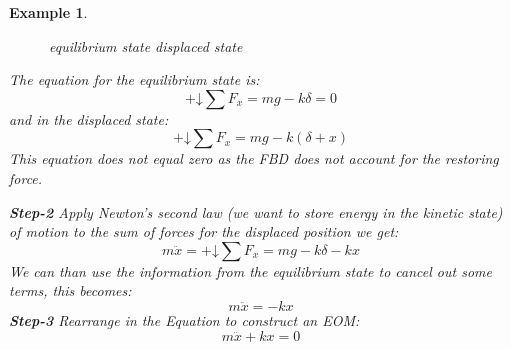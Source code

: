 \documentclass[12pt,letter]{article}
\newtheorem{ex}{Example}
\numberwithin{ex}{section} %
\newenvironment{example}{\begin{mdframed}[middlelinewidth=0.5mm]\begin{ex}\normalfont}{\end{ex}\end{mdframed}}
\numberwithin{re}{section} %
\newcommand*\downplus{%
  \mathbin{+\mathord\downarrow}}								%
\begin{document}
\begin{example}
\begin{figure}[H]
				equilibrium state \hspace{3cm} displaced state
			\end{figure}		
			\noindent The equation for the equilibrium state is:
			\begin{equation}
				\downplus \sum F_x = mg - k\delta = 0
			\end{equation}
			and in the displaced state:
			\begin{equation}
				\downplus \sum F_x =mg -k(\delta + x)
			\end{equation}	
			This equation does not equal zero as the FBD does not account for the restoring force.	
			
			\noindent \textbf{Step-2} Apply Newton's second law (we want to store energy in the kinetic state) of motion to the sum of forces for the displaced position we get: 		
			\begin{equation}
				m\ddot{x} = \downplus \sum F_x =mg -k\delta -kx
			\end{equation}
			We can than use the information from the equilibrium state to cancel out some terms, this becomes:
			\begin{equation}
				m\ddot{x} = -kx
			\end{equation}				
			\textbf{Step-3} Rearrange in the Equation to construct an EOM: 					
			\begin{equation}
				m\ddot{x} + kx = 0
			\end{equation}			
		\end{example}		
		
\end{document}
